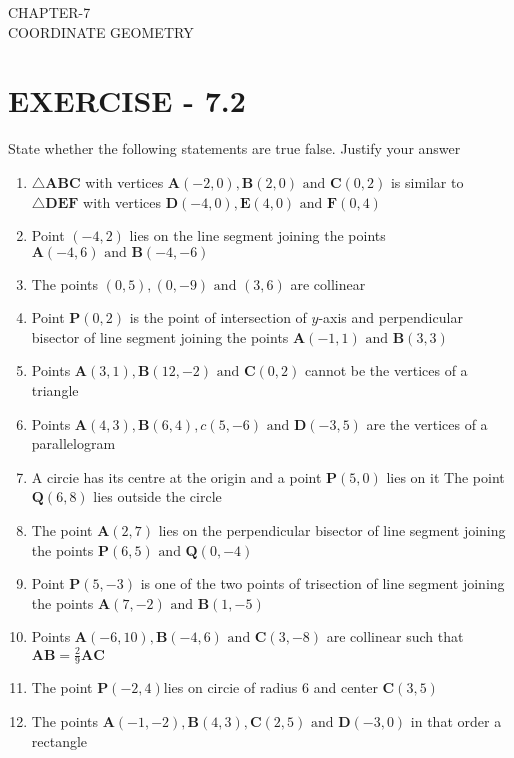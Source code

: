 \documentclass[12pt]{article}
\let\vec\mathbf
\begin{document}
\begin{center}
\textbf\large{CHAPTER-7 \\ COORDINATE GEOMETRY}
\end{center}

\section*{EXERCISE - 7.2}
State whether the following statements are true false. Justify your answer
\begin{enumerate}

	\item $\triangle\vec{A}\vec{B}\vec{C}$ with vertices $\vec{A}(-2,0), \vec{B}(2,0) \text{ and }\vec{C}(0,2)$ is similar to $\triangle \vec{DEF}$  with vertices $\vec {D}(-4,0),\vec{E}(4,0)  \text{ and } \vec{F}(0,4)$  
	\item Point $ (-4,2)$ lies on the line segment joining the points $ \vec{A}(-4,6) \text{ and } \vec{B}(-4,-6)$
 \item The points $(0,5),(0,-9)\text{ and }(3,6)$ are collinear
\item  Point $\vec{P}(0,2)$ is the point of intersection of $y$-axis and perpendicular bisector of line segment joining the points $\vec{A}(-1,1) \text{ and } \vec{B}(3,3)$
\item Points $\vec{A}(3,1), \vec{B}(12,-2) \text{ and } \vec {C}(0,2)$ cannot be the vertices of a triangle
\item Points $\vec{A}(4,3), \vec{B}(6,4),{c}(5,-6) \text{ and } \vec{D}(-3,5)$ are the vertices of a parallelogram  
\item A circie has its centre at the origin and a point $\vec{P}(5,0)$ lies on it The point $\vec{Q}(6,8)$ lies outside the circle
\item The point $\vec{A}(2,7)$ lies on the perpendicular bisector of line segment joining the points $\vec{P}(6,5)\text{ and } \vec{Q}(0,-4)$
\item Point $\vec{P}(5,-3)$ is one of the two points of trisection of line segment joining the points $\vec{A}(7,-2)\text{ and }\vec{B}(1,-5)$
\item Points $\vec{A}(-6,10),\vec{B}(-4,6) \text{ and } \vec{C}(3,-8)$ are collinear such that $\vec{A}\vec{B}=  \frac{2}{9}\vec{A}\vec{C}$
 \item The point $\vec{P}(-2,4)$lies on circie of radius 6 and center $\vec{C}(3,5)$
\item The points $\vec{A}(-1,-2),\vec{B}(4,3),\vec{C}(2,5) \text{ and } \vec{D}(-3,0)$ in that order a rectangle
	\end{enumerate}
\end{document}
